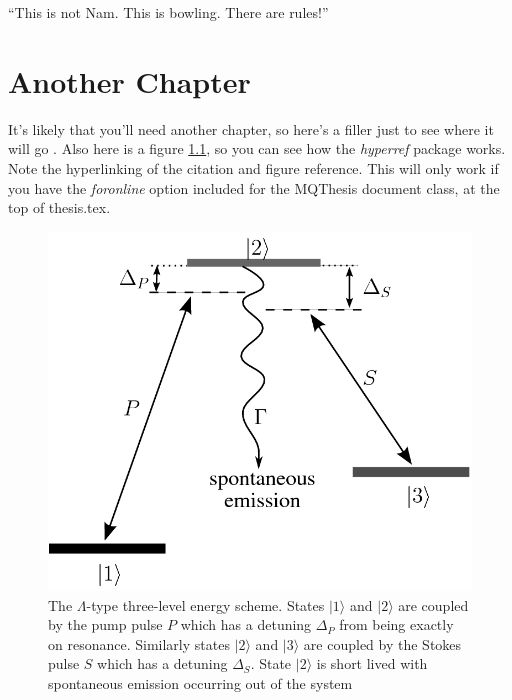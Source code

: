 \begin{savequote}[10cm] %
\sffamily
``This is not Nam. This is bowling. There are rules!'' 
\end{savequote}

\chapter{Another Chapter}
\graphicspath{{ch1/}} 


It's likely that you'll need another chapter, so here's a filler just to see
where it will go \cite{sample}. Also here is a figure \ref{lambda}, so
you can see how the \emph{hyperref} package works. Note the
hyperlinking of the citation and figure reference. This will only work if you have the \emph{foronline} option included for the MQThesis document class, at the top of thesis.tex.

\begin{figure}[tbp]  
\begin{center}
\setlength{\unitlength}{1cm}
\includegraphics[width=8.4\unitlength]{lambda.png}
\end{center}
\caption{The $\Lambda$-type three-level energy scheme. States
$|1\rangle$ and $|2\rangle$ are coupled by the pump pulse $P$ which has a
detuning $\Delta_P$ from being exactly on resonance.  Similarly states
$|2\rangle$ and $|3\rangle$ are coupled by the Stokes pulse $S$ which has a
detuning $ \Delta_S$. State $|2\rangle$ is short lived with spontaneous emission
occurring out of the system}
\label{lambda}
\end{figure}

